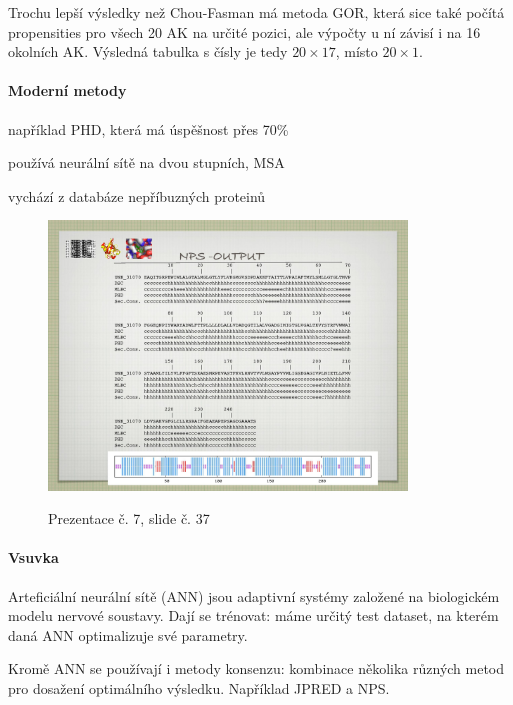 \documentclass[DIV=8]{scrreprt}
\newcommand{\mybox}[2]{
    \paragraph{#1} #2
}
\begin{document}
Trochu lepší výsledky než Chou-Fasman má metoda GOR, která sice také počítá propensities pro všech 20 AK na určité pozici, ale výpočty u ní závisí i na 16 okolních AK. Výsledná tabulka s čísly je tedy \(20 \times 17\), místo \(20 \times 1\).

\paragraph{Moderní metody}
\begin{myItemize}[nosep]
    \item například PHD, která má úspěšnost přes 70\%
\begin{myItemize}[nosep]
    \item používá neurální sítě na dvou stupních, MSA
    \item vychází z databáze nepříbuzných proteinů
\end{myItemize}

\end{myItemize}



\begin{figure}
    \caption{Prezentace č. 7, slide č. 37}
    \includegraphics[width=0.85\textwidth]{slides-7/slide-37.jpg}
    \centering
    \label{slides-7-slide-37}
\end{figure}

\mybox{Vsuvka}{Arteficiální neurální sítě (ANN) jsou adaptivní systémy založené na biologickém modelu nervové soustavy. Dají se trénovat: máme určitý test dataset, na kterém daná ANN optimalizuje své parametry.

Kromě ANN se používají i metody konsenzu: kombinace několika různých metod pro dosažení optimálního výsledku. Například JPRED a NPS.}
\end{document}
